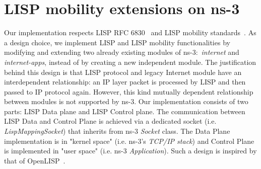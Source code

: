  
\section{ LISP mobility extensions on ns-3}
\label{sec:ns3_lispmn}
Our implementation respects LISP RFC 6830~\cite{rfc6830} and LISP mobility standards~\cite{meyer2016lisp}. As a design choice, we implement LISP and LISP mobility functionalities by modifying and extending two already existing modules of ns-3:~\emph{internet} and \emph{internet-apps}, instead of by creating a new independent module. The justification behind this design is that LISP protocol and legacy Internet module have an interdependent relationship: an IP layer packet is processed by LISP and then passed to IP protocol again. However, this kind mutually dependent relationship between modules is not supported by ns-3. Our implementation consists of two parts: LISP Data plane and LISP Control plane. The communication between LISP Data and Control Plane is achieved via a dedicated socket (i.e. \emph{LispMappingSocket}) that inherits from ns-3 \emph{Socket} class. The Data Plane implementation is in "kernel space" (i.e. ns-3's \emph{TCP/IP stack}) and Control Plane is implemented in "user space" (i.e. ns-3 \emph{Application}). Such a design is inspired by that of OpenLISP~\cite{saucez2009openlisp}.  

